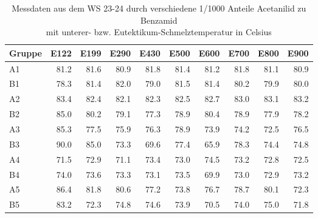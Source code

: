 \begin{table}[h]
\centering \begin{tabular}{lrrrrrrrrr}
\toprule
Gruppe & E122 & E199 & E290 & E430 & E500 & E600 & E700 & E800 & E900 \\
\midrule
A1 & 81.2 & 81.6 & 80.9 & 81.8 & 81.4 & 81.2 & 81.8 & 81.1 & 80.9 \\
B1 & 78.3 & 81.4 & 82.0 & 79.0 & 81.5 & 81.4 & 80.2 & 79.9 & 80.0 \\
A2 & 83.4 & 82.4 & 82.1 & 82.3 & 82.5 & 82.7 & 83.0 & 83.1 & 83.2 \\
B2 & 85.0 & 80.2 & 79.1 & 77.3 & 78.9 & 80.4 & 78.9 & 77.9 & 78.2 \\
A3 & 85.3 & 77.5 & 75.9 & 76.3 & 78.9 & 73.9 & 74.2 & 72.5 & 76.5 \\
B3 & 90.0 & 85.0 & 73.3 & 69.6 & 77.4 & 65.9 & 78.3 & 74.4 & 74.8 \\
A4 & 71.5 & 72.9 & 71.1 & 73.4 & 73.0 & 74.5 & 73.2 & 72.8 & 72.5 \\
B4 & 74.0 & 73.6 & 73.3 & 73.1 & 73.5 & 69.9 & 73.0 & 72.9 & 73.2 \\
A5 & 86.4 & 81.8 & 80.6 & 77.2 & 73.8 & 76.7 & 78.7 & 80.1 & 72.3 \\
B5 & 83.2 & 72.3 & 74.8 & 74.6 & 73.9 & 70.5 & 74.0 & 75.0 & 71.8 \\
\bottomrule
\end{tabular}
\caption{Messdaten aus dem WS 23-24 durch verschiedene 1/1000 Anteile Acetanilid zu Benzamid\\mit unterer- bzw. Eutektikum-Schmelztemperatur in Celsius}
\end{table}
